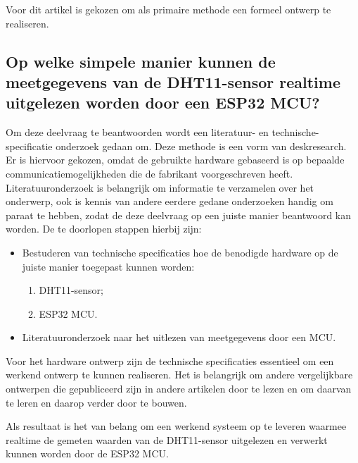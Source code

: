 Voor dit artikel is gekozen om als primaire methode een formeel ontwerp te realiseren.
\subsection{Op welke simpele manier kunnen de meetgegevens van de DHT11-sensor realtime uitgelezen worden door een ESP32 MCU?}
Om deze deelvraag te beantwoorden wordt een literatuur- en technische-specificatie onderzoek gedaan om. Deze methode is een vorm van deskresearch.
\\
Er is hiervoor gekozen, omdat de gebruikte hardware gebaseerd is op bepaalde communicatiemogelijkheden die de fabrikant voorgeschreven heeft. 
Literatuuronderzoek is belangrijk om informatie te verzamelen over het onderwerp, ook is kennis van andere eerdere gedane onderzoeken handig om paraat te hebben, 
zodat de deze deelvraag op een juiste manier beantwoord kan worden.  
De te doorlopen stappen hierbij zijn:
\begin{itemize}
  \item[\ding{226}] Bestuderen van technische specificaties hoe de benodigde hardware op de juiste manier toegepast kunnen worden:
  \begin{enumerate}
    \item DHT11-sensor;
    \item ESP32 MCU.
  \end{enumerate}
  \item[\ding{226}] Literatuuronderzoek naar het uitlezen van meetgegevens door een MCU.
\end{itemize}
Voor het hardware ontwerp zijn de technische specificaties essentieel om een werkend ontwerp te kunnen realiseren. 
Het is belangrijk om andere vergelijkbare ontwerpen die gepubliceerd zijn in andere artikelen door te lezen en om daarvan te leren en daarop verder door te bouwen. 

Als resultaat is het van belang om een werkend systeem op te leveren waarmee realtime de gemeten waarden van de DHT11-sensor uitgelezen en verwerkt kunnen worden door de ESP32 MCU.  

